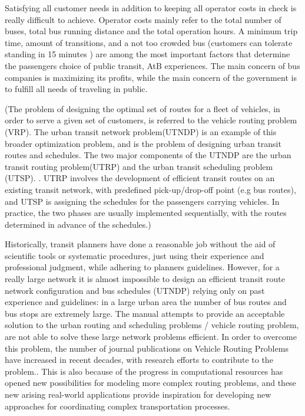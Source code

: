 Satisfying all customer needs in addition to keeping all operator costs in check is really difficult to achieve. Operator costs mainly refer to the total number of buses, total bus running distance and the total operation hours. A minimum trip time, amount of transitions, and a not too crowded bus (customers can tolerate standing in 15 minutes ) are among the most important factors that determine the passengers choice of public transit, AtB experiences. The main concern of bus companies is maximizing its profits, while the main concern of the government is to fulfill all needs of traveling in public.

(The problem of designing the optimal set of routes for a fleet of vehicles, in order to serve a given set of customers, is referred to the vehicle routing problem (VRP). The urban transit network problem(UTNDP) is an example of this broader optimization problem, and is the problem of designing urban transit routes and schedules. The two major components of the UTNDP are the urban transit routing problem(UTRP) and the urban transit scheduling problem (UTSP). \citep{fan09}. UTRP involves the development of efficient transit routes on an existing transit network, with predefined pick-up/drop-off point (e.g bus routes), and UTSP is assigning the schedules for the passengers carrying vehicles. In practice, the two phases are usually implemented sequentially, with the routes determined in advance of the schedules.)

Historically, transit planners have done a reasonable job without the aid of scientific tools or systematic procedures, just using their experience and professional judgment, while adhering to planners guidelines. However, for a really large network it is almost impossible to design an efficient transit route network configuration and bus schedules (UTNDP) relying only on past experience and guidelines: in a large urban area the number of bus routes and bus stops are extremely large. The manual attempts to provide an acceptable solution to the urban routing and scheduling problems / vehicle routing problem, are not able to solve these large network problems efficient. In order to overcome this problem,  the number of journal publications on Vehicle Routing Problems have increased in recent decades, with research efforts to contribute to the problem.. This is also because of the progress in computational resources has opened new possibilities for modeling more complex routing problems, and these new arising real-world applications provide inspiration for developing new approaches for coordinating complex transportation processes.
\citep{vehiclerouting}






